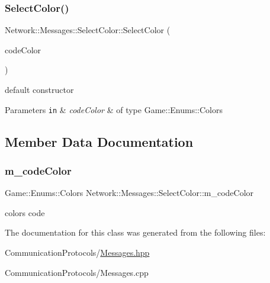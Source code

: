 \subsubsection{\texorpdfstring{Select\+Color()}{SelectColor()}}
{\footnotesize\ttfamily Network\+::\+Messages\+::\+Select\+Color\+::\+Select\+Color (\begin{DoxyParamCaption}\item[{Game\+::\+Enums\+::\+Colors}]{code\+Color }\end{DoxyParamCaption})\hspace{0.3cm}{\ttfamily [inline]}}



default constructor 


\begin{DoxyParams}[1]{Parameters}
\mbox{\tt in}  & {\em code\+Color} & of type Game\+::\+Enums\+::\+Colors \\
\hline
\end{DoxyParams}


\subsection{Member Data Documentation}
\mbox{\label{class_network_1_1_messages_1_1_select_color_abbc40bfe896ce4006ef7f1160a0a0605}} 
\subsubsection{\texorpdfstring{m\+\_\+code\+Color}{m\_codeColor}}
{\footnotesize\ttfamily Game\+::\+Enums\+::\+Colors Network\+::\+Messages\+::\+Select\+Color\+::m\+\_\+code\+Color}

color\textquotesingle{}s code 

The documentation for this class was generated from the following files\+:\begin{DoxyCompactItemize}
\item 
Communication\+Protocols/\hyperlink{_messages_8hpp}{Messages.\+hpp}\item 
Communication\+Protocols/Messages.\+cpp\end{DoxyCompactItemize}
